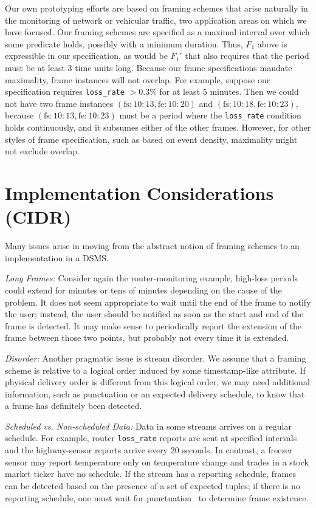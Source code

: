 \documentclass{vldb}
\begin{document}
\begin{appendix}
Our own prototyping efforts are based on framing schemes that arise naturally in the monitoring of network or vehicular traffic, two application areas on which we have focused. Our framing schemes are specified as a maximal interval over which some predicate holds, possibly with a minimum duration. Thus, $F_1$ above is expressible in our specification, as would be $F_1'$ that also requires that the period must be at least 3 time units long. Because our frame specifications mandate maximality, frame instances will not overlap. For example, suppose our specification requires \texttt{loss\_rate} $> 0.3\%$ for at least 5 minutes. Then we could not have two frame instances $(\text{fs}: 10:13, \text{fe}: 10:20)$ and $(\text{fs}: 10:18, \text{fe}: 10:23)$, because $(\text{fs}: 10:13, \text{fe}: 10:23)$ must be a period where the \texttt{loss\_rate} condition holds continuously, and it subsumes either of the other frames. However, for other styles of frame specification, such as based on event density, maximality might not exclude overlap.

\section{Implementation Considerations (CIDR)}
\label{sec:considerations-cidr}

Many issues arise in moving from the abstract notion of framing schemes to an implementation in a DSMS. 

\emph{Long Frames:} Consider again the router-monitoring example, high-loss periods could extend for minutes or tens of minutes depending on the cause of the problem. It does not seem appropriate to wait until the end of the frame to notify the user; instead, the user should be notified as soon as the start and end of the frame is detected. It may make sense to periodically report the extension of the frame between those two points, but probably not every time it is extended.

\emph{Disorder:} Another pragmatic issue is stream disorder. We assume that a framing scheme is relative to a logical order induced by some timestamp-like attribute. If physical delivery order is different from this logical order, we may need additional information, such as punctuation or an expected delivery schedule, to know that a frame has definitely been detected.

\emph{Scheduled vs. Non-scheduled Data:} Data in some streams arrives on a regular schedule. For example, router \texttt{loss\_rate} reports are sent at specified intervals and the highway-sensor reports arrive every 20 seconds. In contrast, a freezer sensor may report temperature only on temperature change and trades in a stock market ticker have no schedule. If the stream has a reporting schedule, frames can be detected based on the presence of a set of expected tuples; if there is no reporting schedule, one must wait for punctuation~\cite{TMS+2003} to determine frame existence. 


\end{appendix}
\end{document}

